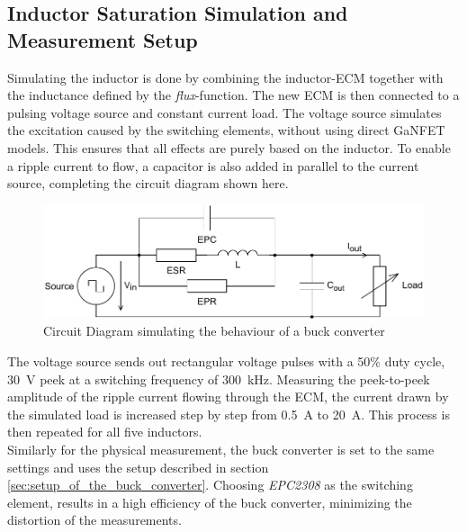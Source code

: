 \subsection{Inductor Saturation Simulation and Measurement Setup}
Simulating the inductor is done by combining the inductor-\ac{ECM} together with the inductance defined by the \textit{flux}-function. The new \ac{ECM} is then connected to a pulsing voltage source and constant current load. The voltage source simulates the excitation caused by the switching elements, without using direct \ac{GaNFET} models. This ensures that all effects are purely based on the inductor. To enable a ripple current to flow, a capacitor is also added in parallel to the current source, completing the circuit diagram shown here.
\begin{figure}[H]
    \centering
    \includegraphics[width=1\linewidth]{Bilder/Kapitel4/Saturation_Validation_ECM.pdf}
    \caption{Circuit Diagram simulating the behaviour of a buck converter}
    \label{fig:saturation_validation_circuit_diagramm}
\end{figure}
The voltage source sends out rectangular voltage pulses with a 50\% duty cycle, \SI{30}{\V} peek at a switching frequency of \SI{300}{\kilo\Hz}. Measuring the peek-to-peek amplitude of the ripple current flowing through the \ac{ECM}, the current drawn by the simulated load is increased step by step from \SI{0.5}{\A} to \SI{20}{\A}. This process is then repeated for all five inductors.\\
Similarly for the physical measurement, the buck converter is set to the same settings and uses the setup described in section \ref{sec:setup_of_the_buck_converter}. Choosing \textit{EPC2308} as the switching element, results in a high efficiency of the buck converter, minimizing the distortion of the measurements. 
